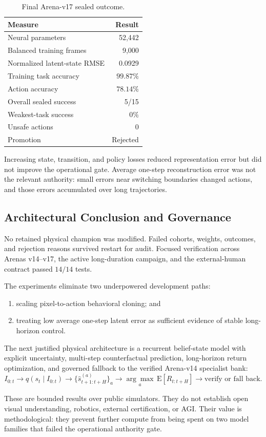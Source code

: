 \begin{table}[htbp]
\centering
\caption{Final Arena-v17 sealed outcome.}
\label{tab:arena-v17-results}
\begin{tabular}{lr}
\hline
Measure & Result \\
\hline
Neural parameters & 52,442 \\
Balanced training frames & 9,000 \\
Normalized latent-state RMSE & 0.0929 \\
Training task accuracy & $99.87\%$ \\
Action accuracy & $78.14\%$ \\
Overall sealed success & 5/15 \\
Weakest-task success & $0\%$ \\
Unsafe actions & 0 \\
Promotion & Rejected \\
\hline
\end{tabular}
\end{table}

Increasing state, transition, and policy losses reduced representation error but
did not improve the operational gate.  Average one-step reconstruction error
was not the relevant authority: small errors near switching boundaries changed
actions, and those errors accumulated over long trajectories.

\subsection{Architectural Conclusion and Governance}

No retained physical champion was modified.  Failed cohorts, weights, outcomes,
and rejection reasons survived restart for audit.  Focused verification across
Arenas v14--v17, the active long-duration campaign, and the external-human
contract passed $14/14$ tests.

The experiments eliminate two underpowered development paths:
\begin{enumerate}
 \item scaling pixel-to-action behavioral cloning; and
 \item treating low average one-step latent error as sufficient evidence of
 stable long-horizon control.
\end{enumerate}
The next justified physical architecture is a recurrent belief-state model with
explicit uncertainty, multi-step counterfactual prediction, long-horizon return
optimization, and governed fallback to the verified Arena-v14 specialist bank:
\begin{equation}
 I_{0:t}\rightarrow q(s_t\mid I_{0:t})
 \rightarrow \{\hat{s}^{(a)}_{t+1:t+H}\}_{a}
 \rightarrow \underset{a}{\arg\max}\,\mathrm{E}[R_{t:t+H}]
 \rightarrow \text{verify or fall back}.
\end{equation}

These are bounded results over public simulators.  They do not establish open
visual understanding, robotics, external certification, or AGI.  Their value is
methodological: they prevent further compute from being spent on two model
families that failed the operational authority gate.
